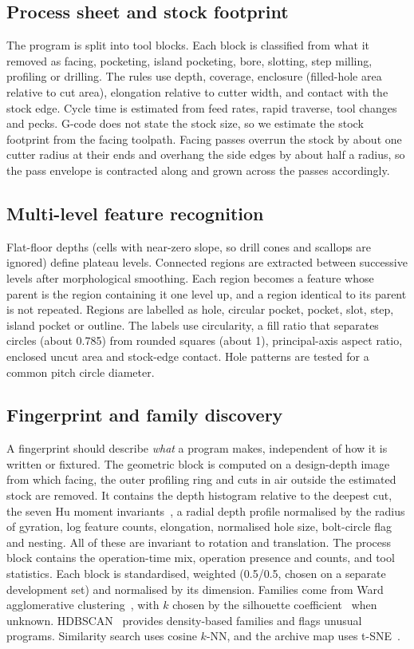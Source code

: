 \documentclass[conference]{IEEEtran}
\begin{document}
\subsection{Process sheet and stock footprint}
The program is split into tool blocks. Each block is classified from what it
removed as facing, pocketing, island pocketing, bore, slotting, step milling,
profiling or drilling. The rules use depth, coverage, enclosure (filled-hole
area relative to cut area), elongation relative to cutter width, and contact
with the stock edge. Cycle time is estimated from feed rates, rapid traverse,
tool changes and pecks. G-code does not state the stock size, so we estimate
the stock footprint from the facing toolpath. Facing passes overrun the stock
by about one cutter radius at their ends and overhang the side edges by about
half a radius, so the pass envelope is contracted along and grown across the
passes accordingly.

\subsection{Multi-level feature recognition}
Flat-floor depths (cells with near-zero slope, so drill cones and scallops are
ignored) define plateau levels. Connected regions are extracted between
successive levels after morphological smoothing. Each region becomes a feature
whose parent is the region containing it one level up, and a region identical
to its parent is not repeated. Regions are labelled as hole, circular pocket,
pocket, slot, step, island pocket or outline. The labels use circularity, a
fill ratio that separates circles (about 0.785) from rounded squares (about 1),
principal-axis aspect ratio, enclosed uncut area and stock-edge contact. Hole
patterns are tested for a common pitch circle diameter.

\subsection{Fingerprint and family discovery}
A fingerprint should describe \emph{what} a program makes, independent of
how it is written or fixtured. The geometric block is computed on a
design-depth image from which facing, the outer profiling ring and cuts in air
outside the estimated stock are removed. It contains the depth histogram
relative to the deepest cut, the seven Hu moment invariants~\cite{hu1962},
a radial depth profile normalised by the radius of gyration, log feature
counts, elongation, normalised hole size, bolt-circle flag and nesting. All of
these are invariant to rotation and translation. The process block contains
the operation-time mix, operation presence and counts, and tool statistics.
Each block is standardised, weighted (0.5/0.5, chosen on a separate
development set) and normalised by its dimension. Families come from Ward
agglomerative clustering~\cite{ward1963}, with $k$ chosen by the silhouette
coefficient~\cite{rousseeuw1987} when unknown. HDBSCAN~\cite{campello2013,mcinnes2017} provides density-based families and flags
unusual programs. Similarity search uses cosine $k$-NN, and the archive map
uses t-SNE~\cite{vandermaaten2008}.
\end{document}

